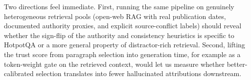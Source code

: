 Two directions feel immediate. First, running the same pipeline on
genuinely heterogeneous retrieval pools (open-web RAG with real
publication dates, documented authority proxies, and explicit
source-conflict labels) should reveal whether the sign-flip of the
authority and consistency heuristics is specific to HotpotQA or a
more general property of distractor-rich retrieval. Second, lifting
the trust score from paragraph selection into generation time, for
example as a token-weight gate on the retrieved context, would let us
measure whether better-calibrated selection translates into fewer
hallucinated attributions downstream.
